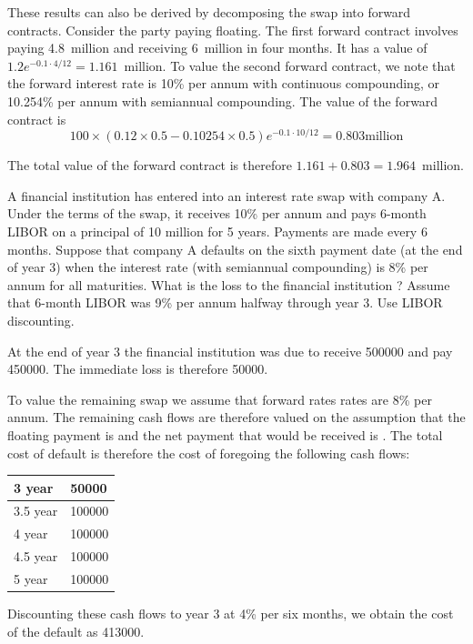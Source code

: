 \documentclass[12pt,a4paper]{exam}
\begin{document}
\begin{questions}
\begin{solution}
These results can also be derived by decomposing the swap into forward contracts. Consider the party paying floating. The first forward contract involves paying 4.8~million and receiving 6~million in four months. It has a value of $1.2e^{-0.1\cdot 4/12} = 1.161$~million.
To value the second forward contract, we note that the forward interest rate is 10\% per annum with continuous compounding, or 10.254\% per annum with semiannual compounding. The value of the forward contract is
\begin{equation*}
100\times  (0.12\times 0.5-0.10254\times 0.5)e^{-0.1\cdot 10/12} = 0.803 \text{million}
\end{equation*}

The total value of the forward contract is therefore $1.161 + 0.803 = 1.964$~million.
\end{solution}

\question  A financial institution has entered into an interest rate swap with company A. Under the terms of the swap, it receives 10\% per annum and pays 6-month LIBOR on a principal of 10 million for 5 years. Payments are made every 6 months. 
Suppose that company A defaults on the sixth payment date (at the end of year 3) when the interest rate (with semiannual compounding) is 8\% per annum for all maturities. 
What is the loss to the financial institution ? Assume that 6-month LIBOR was 9\% per annum halfway through year 3. 
Use LIBOR discounting.

\begin{solution}
At the end of year 3 the financial institution was due to receive 500000 and pay 450000. The immediate loss is therefore 50000.

To value the remaining swap we assume that forward rates 
rates are 8\% per annum. The remaining cash flows are therefore valued on the assumption that the floating payment is and the net payment that would be received is . The
total cost of default is therefore the cost of foregoing the following cash flows:
\begin{center}
	\begin{tabular}{|l|l|}
	\hline
	3 year & 50000 \\ \hline
	3.5 year & 100000 \\ \hline
	4 year &  100000 \\ \hline
	4.5 year & 100000 \\ \hline
	5 year & 100000 \\ \hline
	\end{tabular}
\end{center}
Discounting these cash flows to year 3 at 4\% per six months, we obtain the cost of the default as 413000.
\end{solution}


\end{questions}
\end{document}
